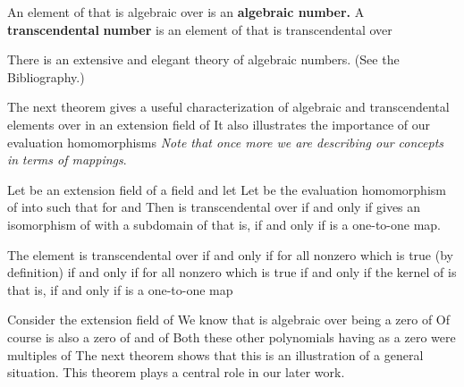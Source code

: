 \documentclass[11pt,oneside]{article}
\begin{document}
\begin{BookBody}

 An element of  that is algebraic over  is an\textbf{ algebraic number.} A\textbf{ transcendental} \textbf{number} is an element of  that is transcendental over \BookEnd{\blacksquare}

There is an extensive and elegant theory of algebraic numbers. (See the Bibliography.)

The next theorem gives a useful characterization of algebraic and transcendental elements over  in an extension field  of  It also illustrates the importance of our evaluation homomorphisms  \textit{Note that once more we are describing our concepts in} \textit{terms of mappings}.

 Let  be an extension field of a field  and let  Let  be the evaluation homomorphism of  into  such that  for  and  Then \BookInline{\alpha } is transcendental over  if and only if \BookInline{\phi _{\alpha }} gives an isomorphism of  with a subdomain of  that is, if and only if \BookInline{\phi _{\alpha }} is a one-to-one map.

 The element \BookInline{\alpha } is transcendental over  if and only if  for all nonzero   which is true (by definition) if and only if  for all nonzero  which is true if and only if the kernel of \BookInline{\phi _{\alpha }} is  that is, if and only if \BookInline{\phi _{\alpha }} is a one-to-one map\BookEnd{\blacklozenge}


Consider the extension field  of  We know that  is algebraic over  being a zero of  Of course is also a zero of  and of   Both these other polynomials having  as a zero were multiples of  The next theorem shows that this is an illustration of a general situation. This theorem plays a central role in our later work.


\end{BookBody}
\end{document}
